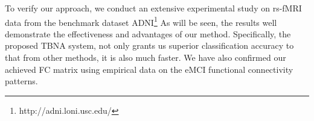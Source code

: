 \documentclass[journal]{IEEEtran}
\begin{document}
%		
%		
%		
%	
%	
%	
%	
	To verify our approach, we conduct an extensive experimental study on rs-fMRI data from the
	benchmark dataset ADNI\footnote{http://adni.loni.usc.edu/} As will be seen, the results well demonstrate the effectiveness and advantages of our method. Specifically, the proposed TBNA system, not only grants us superior classification accuracy to that from other methods, it is also much faster. We have also confirmed our achieved FC matrix using empirical data on the eMCI functional connectivity patterns.
	
\end{document}
